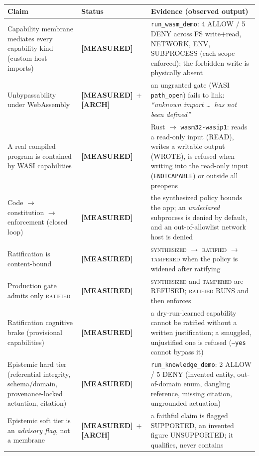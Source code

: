 \documentclass[10pt,a4paper]{article}
\newcommand{\code}[1]{\texttt{\footnotesize #1}}
\newcommand{\measured}{\textcolor{msblue}{\scriptsize\textbf{[MEASURED]}}}
\newcommand{\arch}{\textcolor{msgray}{\scriptsize\textbf{[ARCH]}}}
\begin{document}
\renewcommand{\arraystretch}{1.15}
\begin{longtable}{@{}>{\raggedright\arraybackslash}p{8.9cm} p{1.5cm} >{\raggedright\arraybackslash}p{5.8cm}@{}}
\toprule
\footnotesize\textbf{Claim} & \footnotesize\textbf{Status} & \footnotesize\textbf{Evidence (observed output)} \\
\midrule
\endhead
Capability membrane mediates every capability kind (custom host imports) & \measured &
\code{run\_wasm\_demo}: 4 ALLOW / 5 DENY across FS write+read, NETWORK, ENV, SUBPROCESS (each scope-enforced); the forbidden write is physically absent \\
Unbypassability under WebAssembly & \measured\ \mbox{+} \arch &
an ungranted gate (WASI \code{path\_open}) fails to link: \emph{``unknown import \ldots\ has not been defined''} \\
A real compiled program is contained by WASI capabilities & \measured &
Rust $\to$ \code{wasm32-wasip1}: reads a read-only input (READ), writes a writable output (WROTE),
is refused when writing into the read-only input (\code{ENOTCAPABLE}) or outside all preopens \\
Code $\to$ constitution $\to$ enforcement (closed loop) & \measured &
the synthesized policy bounds the app; an \emph{undeclared} subprocess is denied by default, and an
out-of-allowlist network host is denied \\
Ratification is content-bound & \measured &
\textsc{synthesized} $\to$ \textsc{ratified} $\to$ \textsc{tampered} when the policy is widened after ratifying \\
Production gate admits only \textsc{ratified} & \measured &
\textsc{synthesized} and \textsc{tampered} are REFUSED; \textsc{ratified} RUNS and then enforces \\
Ratification cognitive brake (provisional capabilities) & \measured &
a dry-run-learned capability cannot be ratified without a written justification; a smuggled, unjustified one is refused (\code{--yes} cannot bypass it) \\
Epistemic hard tier (referential integrity, schema/domain, provenance-locked actuation, citation) & \measured &
\code{run\_knowledge\_demo}: 2 ALLOW / 5 DENY (invented entity, out-of-domain enum, dangling reference, missing citation, ungrounded actuation) \\
Epistemic soft tier is an \emph{advisory flag}, not a membrane & \measured\ \mbox{+} \arch &
a faithful claim is flagged SUPPORTED, an invented figure UNSUPPORTED; it qualifies, never contains \\

\end{longtable}
\end{document}
